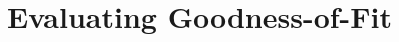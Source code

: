 \begin{comment}
Node statistics
	 node	 mean	 sd	 MC error	2.5%
	D	5.939	1.009	0.01712	4.18	5.822	8.211	1001	27000
	N	39.78	6.756	0.1147	28.0	39.0	55.0	1001	27000
	X1new	9.006	2.701	0.02151	4.603	8.699	15.18	1001	27000
	X1obs	11.98	3.396	0.04019	6.437	11.61	19.69	1001	27000
	X3new	13.13	3.218	0.01885	7.748	12.84	20.26	1001	27000
	X3obs	21.4	2.116	0.02102	17.83	21.2	26.11	1001	27000
	Xnew	61.54	6.483	0.0668	49.39	61.26	74.8	1001	27000
	Xobs	88.74	6.003	0.06467	77.85	88.46	101.4	1001	27000
	alpha.sex	-0.4355	1.192	0.01962	-2.624	-0.6607	2.605	1001	27000
	beta	1.257	2.088	0.1191	0.06376	1.036	6.652	1001	27000
	beta.sex	0.5605	1.675	0.06955	-2.723	0.7576	2.92	1001	27000
	deviance	438.9	12.25	0.1858	417.0	438.0	464.9	1001	27000
	logitp0	-2.598	0.287	0.01129	-3.088	-2.624	-1.998	1001	27000
	mod[1]	0.5939	0.4911	0.01784	0.0	1.0	1.0	1001	27000
	mod[2]	0.5251	0.4994	0.02614	0.0	1.0	1.0	1001	27000
	psi	0.3312	0.06925	0.001093	0.2101	0.3264	0.4776	1001	27000
	psi.sex	0.5425	0.1038	0.002119	0.3366	0.5443	0.7389	1001	27000
	sigma	1.045	0.6963	0.04014	0.2743	0.6947	2.801	1001	27000
\end{verbatim}

\end{comment}




\section{Evaluating Goodness-of-Fit}

